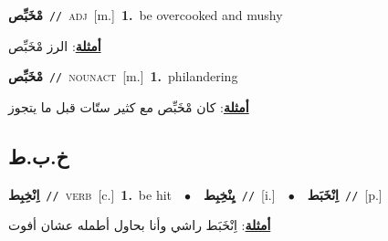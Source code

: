 \documentclass[10pt,a4paper,twoside]{article} %
\begin{document}
\begin{multicols}{2}
{{\setlength\topsep{0pt}\textbf{\foreignlanguage{arabic}{مْخَبِّص}}\ {\color{gray}\texttt{//}\color{black}}\ \textsc{adj}\ [m.]\ \textbf{1.}~be overcooked and mushy\  \begin{flushright}\color{gray}\foreignlanguage{arabic}{\textbf{\underline{\foreignlanguage{arabic}{أمثلة}}}: الرز مْخَبِّص}\end{flushright}\color{black}} \vspace{2mm}

{\setlength\topsep{0pt}\textbf{\foreignlanguage{arabic}{مْخَبِّص}}\ {\color{gray}\texttt{//}\color{black}}\ \textsc{noun\textunderscore act}\ [m.]\ \textbf{1.}~philandering\  \begin{flushright}\color{gray}\foreignlanguage{arabic}{\textbf{\underline{\foreignlanguage{arabic}{أمثلة}}}: كان مْخَبِّص مع كثير ستّات قبل ما يتجوز}\end{flushright}\color{black}} \vspace{2mm}

\vspace{-3mm}
\subsection*{\color{blue}\foreignlanguage{arabic}{خ.ب.ط}\color{blue}{}} 

{\setlength\topsep{0pt}\textbf{\foreignlanguage{arabic}{اِنْخِبِط}}\ {\color{gray}\texttt{//}\color{black}}\ \textsc{verb}\ [c.]\ \textbf{1.}~be hit\ \ $\bullet$\ \ \setlength\topsep{0pt}\textbf{\foreignlanguage{arabic}{يِنْخِبِط}}\ {\color{gray}\texttt{//}\color{black}}\ [i.]\ \ $\bullet$\ \ \setlength\topsep{0pt}\textbf{\foreignlanguage{arabic}{اِنْخَبَط}}\ {\color{gray}\texttt{//}\color{black}}\ [p.]\  \begin{flushright}\color{gray}\foreignlanguage{arabic}{\textbf{\underline{\foreignlanguage{arabic}{أمثلة}}}: اِنْخَبَط راشي وأنا بحاول أطمله عشان أفوت}\end{flushright}\color{black}} \vspace{2mm}

}
\end{multicols}
\end{document}

